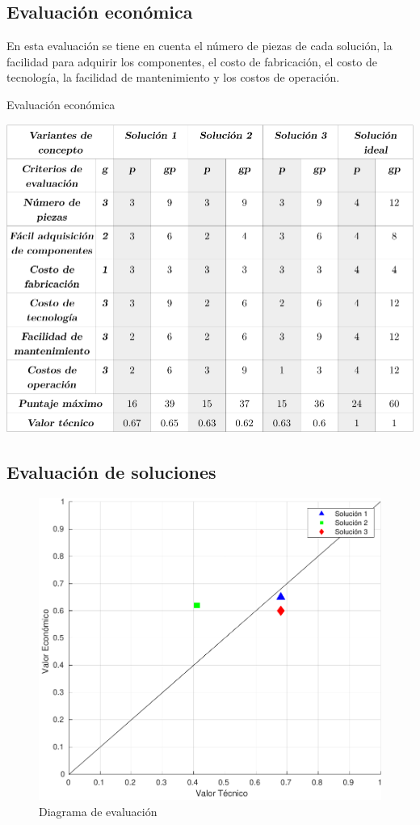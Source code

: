\subsection{Evaluación económica}
En esta evaluación se tiene en cuenta el número de piezas de cada solución, la facilidad para adquirir los componentes, el costo de fabricación, el costo de tecnología, la facilidad de mantenimiento y los costos de operación.
\begin{table}[htb!]
  \centering
  \caption{Evaluación económica}
  \label{diag:eval_econ}
  \includegraphics[width=0.95\linewidth]{eval_econ.pdf}
\end{table}

\newpage

\subsection{Evaluación de soluciones}
\begin{figure}[htb!]
\centering
\includegraphics[width=\textwidth]{grafico.pdf}
\caption{Diagrama de evaluación}
\label{diag:diag_eval}
\end{figure}

